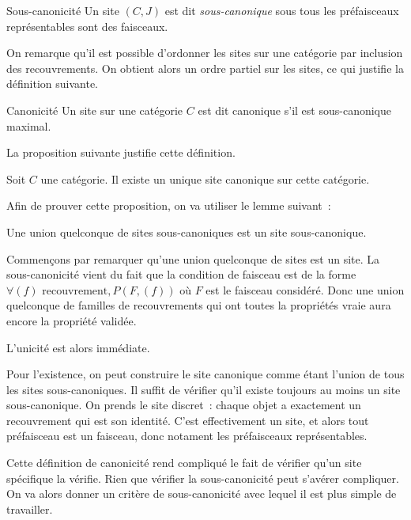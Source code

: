 
\begin{defi}{Sous-canonicité}
    Un site $(C,J)$ est dit \emph{sous-canonique} sous tous les préfaisceaux
    représentables sont des faisceaux.
\end{defi}

On remarque qu'il est possible d'ordonner les sites sur une catégorie par inclusion
des recouvrements. On obtient alors un ordre partiel sur les sites, ce qui justifie
la définition suivante.

\begin{defi}{Canonicité}
    Un site sur une catégorie $C$ est dit canonique s'il est sous-canonique maximal.
\end{defi}

La proposition suivante justifie cette définition.

\begin{prop}
    Soit $C$ une catégorie. Il existe un unique site canonique sur cette catégorie.
\end{prop}

\begin{pv}
    Afin de prouver cette proposition, on va utiliser le lemme suivant~:

    \begin{lem}
        Une union quelconque de sites sous-canoniques est un site sous-canonique.
    \end{lem}
    \begin{pv}
        Commençons par remarquer qu'une union quelconque de sites est un site.
        La sous-canonicité vient du fait que la condition de faisceau est de la
        forme $\forall (f)\text{ recouvrement}, P(F,(f))$ où $F$ est le
        faisceau considéré.  Donc une union quelconque de familles de
        recouvrements qui ont toutes la propriétés vraie aura encore la
        propriété validée.
    \end{pv}

    L'unicité est alors immédiate.

    Pour l'existence, on peut construire le site canonique comme étant l'union
    de tous les sites sous-canoniques. Il suffit de vérifier qu'il existe toujours
    au moins un site sous-canonique. On prends le site discret~: chaque objet a
    exactement un recouvrement qui est son identité. C'est effectivement un site,
    et alors tout préfaisceau est un faisceau, donc notament les préfaisceaux
    représentables.
\end{pv}

Cette définition de canonicité rend compliqué le fait de vérifier qu'un site
spécifique la vérifie. Rien que vérifier la sous-canonicité peut s'avérer compliquer. On
va alors donner un critère de sous-canonicité avec lequel il est plus simple de
travailler.


